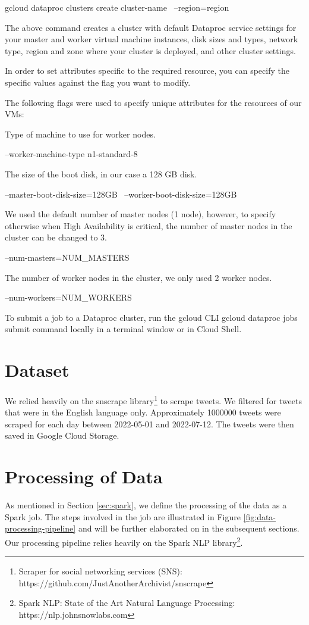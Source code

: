 \documentclass[a4paper,12pt]{article}
\begin{document}
gcloud dataproc clusters create cluster-name \
--region=region

The above command creates a cluster with default Dataproc service settings for your master and worker virtual machine
instances, disk sizes and types, network type, region and zone where your cluster is deployed, and other cluster settings.

In order to set attributes specific to the required resource, you can specify the specific values against the
flag you want to modify.

The following flags were used to specify unique attributes for the resources of our VMs:

Type of machine to use for worker nodes.

--worker-machine-type n1-standard-8 \

The size of the boot disk, in our case a 128 GB disk.

--master-boot-disk-size=128GB \
--worker-boot-disk-size=128GB \

We used the default number of master nodes (1 node), however, to specify otherwise when High Availability is critical,
the number of master nodes in the cluster can be changed to 3.

--num-masters=NUM_MASTERS

The number of worker nodes in the cluster, we only used 2 worker nodes.

--num-workers=NUM_WORKERS \

To submit a job to a Dataproc cluster, run the gcloud CLI gcloud dataproc jobs submit command locally
in a terminal window or in Cloud Shell.

\section{Dataset}
\label{sec:dataset}
We relied heavily on the snscrape library\footnote{Scraper for social networking services (SNS): https://github.com/JustAnotherArchivist/snscrape} to scrape tweets. We filtered for tweets that were in the English language only. Approximately 1000000 tweets were scraped for each day between 2022-05-01 and 2022-07-12. The tweets were then saved in Google Cloud Storage.

\section{Processing of Data}

As mentioned in Section \ref{sec:spark}, we define the processing of the data as a Spark job. The steps involved in the job are illustrated in Figure \ref{fig:data-processing-pipeline} and will be further elaborated on in the subsequent sections. Our processing pipeline relies heavily on the Spark NLP library\footnote{Spark NLP: State of the Art Natural Language Processing: https://nlp.johnsnowlabs.com}.
\end{document}
